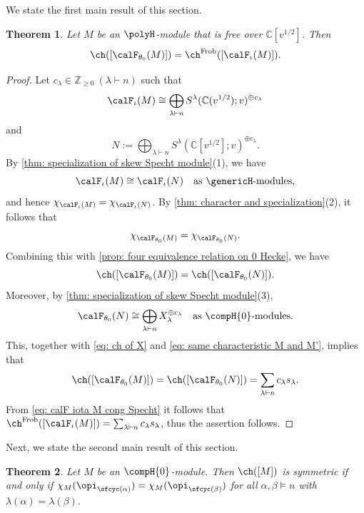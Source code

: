 \documentclass[12pt, reqno]{amsart}
\theoremstyle{plain}
\newtheorem{theorem}{Theorem}[section]
\theoremstyle{definition}
\numberwithin{equation}{section}
\numberwithin{figure}{section}
\numberwithin{table}{section}
\def\Z{\mathbb Z}
\def\C{\mathbb C}
\begin{document}
We state the first main result of this section.


\begin{theorem}\label{thm: characteristic pres prop spec}
Let $M$ be an $\polyH$-module that is free over $\C[v^{1/2}]$.
Then 
\[
\ch([\calF_{\theta_0}(M)]) = \ch^{\rm Frob}([\calF_{\iota}(M)]).
\]
\end{theorem}
\begin{proof}
Let $c_\lambda \in \Z_{\geq 0}~(\lambda \vdash n)$ such that
\begin{align}\label{eq: calF iota M cong Specht}
\calF_\iota(M) \cong \bigoplus_{\lambda \vdash n} S^{\lambda}(\C(v^{1/2});v)^{\oplus c_\lambda}
\end{align}
and
\[
N := \bigoplus_{\lambda \vdash n} S^{\lambda}(\C[v^{1/2}];v)^{\oplus c_\lambda}.
\]
By \cref{thm: specialization of skew Specht module}(1), we have 
\[
\calF_\iota(M) \cong \calF_\iota(N) \quad\text{as $\genericH$-modules,}
\]
and hence $\chi_{\calF_\iota(M)} = \chi_{\calF_\iota(N)}$.
By \cref{thm: character and specialization}(2), it follows that 
\[
\chi_{\calF_{\theta_0}(M)} =  \chi_{\calF_{\theta_0}(N)}.
\]
Combining this with \cref{prop: four equivalence relation on 0 Hecke}, we have 
\begin{equation}\label{eq: same characteristic M and M'}
    \ch([\calF_{\theta_0}(M)]) = \ch([\calF_{\theta_0}(N)]).
\end{equation}
Moreover, by \cref{thm: specialization of skew Specht module}(3), 
\[
\calF_{\theta_0}(N) \cong  \bigoplus_{\lambda \vdash n} X_\lambda^{\oplus c_\lambda} \quad\text{as $\compH{0}$-modules}.
\]
This, together with \cref{eq: ch of X} and \cref{eq: same characteristic M and M'}, implies that 
\[
\ch([\calF_{\theta_0}(M)]) 
= \ch([\calF_{\theta_0}(N)]) 
= \sum_{\lambda\vdash n} c_\lambda s_\lambda.
\]
From \cref{eq: calF iota M cong Specht} it follows that $\ch^{\rm Frob}([\calF_\iota(M)]) = \sum_{\lambda\vdash n} c_\lambda s_\lambda$, thus the assertion follows.
\end{proof}

Next, we state the second main result of this section.



\begin{theorem}\label{thm: char of symmetric 0-Hecke}
Let $M$ be an $\compH{0}$-module.
Then  $\ch([M])$ is symmetric if and only if
$\chi_M(\opi_{\sfcyc(\alpha)}) =  \chi_M(\opi_{\sfcyc(\beta)})$ for all $\alpha, \beta \models n$ with $\lambda(\alpha) = \lambda(\beta)$.
\end{theorem}
\end{document}
